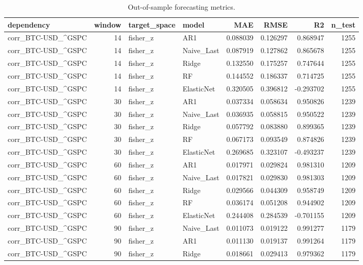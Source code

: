 \begin{table}
\caption{Out-of-sample forecasting metrics.}
\label{tab:metrics_full}
\begin{tabular}{lrllrrrr}
\toprule
dependency & window & target_space & model & MAE & RMSE & R2 & n_test \\
\midrule
corr_BTC-USD_^GSPC & 14 & fisher_z & AR1 & 0.088039 & 0.126297 & 0.868947 & 1255 \\
corr_BTC-USD_^GSPC & 14 & fisher_z & Naive_Last & 0.087919 & 0.127862 & 0.865678 & 1255 \\
corr_BTC-USD_^GSPC & 14 & fisher_z & Ridge & 0.132550 & 0.175257 & 0.747644 & 1255 \\
corr_BTC-USD_^GSPC & 14 & fisher_z & RF & 0.144552 & 0.186337 & 0.714725 & 1255 \\
corr_BTC-USD_^GSPC & 14 & fisher_z & ElasticNet & 0.320505 & 0.396812 & -0.293702 & 1255 \\
corr_BTC-USD_^GSPC & 30 & fisher_z & AR1 & 0.037334 & 0.058634 & 0.950826 & 1239 \\
corr_BTC-USD_^GSPC & 30 & fisher_z & Naive_Last & 0.036935 & 0.058815 & 0.950522 & 1239 \\
corr_BTC-USD_^GSPC & 30 & fisher_z & Ridge & 0.057792 & 0.083880 & 0.899365 & 1239 \\
corr_BTC-USD_^GSPC & 30 & fisher_z & RF & 0.067173 & 0.093549 & 0.874826 & 1239 \\
corr_BTC-USD_^GSPC & 30 & fisher_z & ElasticNet & 0.269685 & 0.323107 & -0.493237 & 1239 \\
corr_BTC-USD_^GSPC & 60 & fisher_z & AR1 & 0.017971 & 0.029824 & 0.981310 & 1209 \\
corr_BTC-USD_^GSPC & 60 & fisher_z & Naive_Last & 0.017821 & 0.029830 & 0.981303 & 1209 \\
corr_BTC-USD_^GSPC & 60 & fisher_z & Ridge & 0.029566 & 0.044309 & 0.958749 & 1209 \\
corr_BTC-USD_^GSPC & 60 & fisher_z & RF & 0.036174 & 0.051208 & 0.944902 & 1209 \\
corr_BTC-USD_^GSPC & 60 & fisher_z & ElasticNet & 0.244408 & 0.284539 & -0.701155 & 1209 \\
corr_BTC-USD_^GSPC & 90 & fisher_z & Naive_Last & 0.011073 & 0.019122 & 0.991277 & 1179 \\
corr_BTC-USD_^GSPC & 90 & fisher_z & AR1 & 0.011130 & 0.019137 & 0.991264 & 1179 \\
corr_BTC-USD_^GSPC & 90 & fisher_z & Ridge & 0.018661 & 0.029413 & 0.979362 & 1179 \\

\end{tabular}
\end{table}
